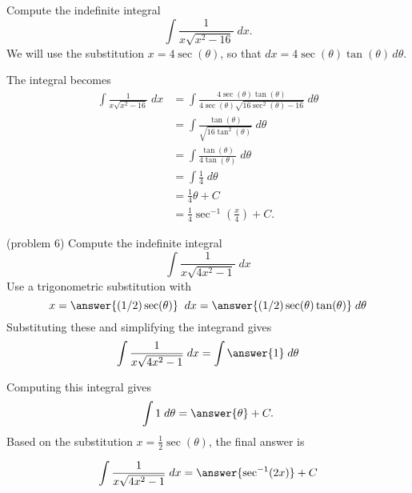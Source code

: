 \documentclass{ximera}
\begin{document}
\begin{example}[example 6]
Compute the indefinite integral
\[
\int \frac{1}{x\sqrt{x^2-16}} \; dx.
\]
We will use the substitution $x = 4\sec(\theta)$,
so that $dx = 4\sec(\theta)\tan(\theta) \, d\theta$.

The integral becomes
\begin{align*}
\int \frac{1}{x\sqrt{x^2-16}}\; dx &= \int \frac{4\sec(\theta)\tan(\theta)}{4\sec(\theta)\sqrt{16\sec^2(\theta)-16}}\; d\theta\\[6pt]
                                 &=  \int \frac{\tan(\theta)}{\sqrt{16\tan^2(\theta)}}\; d\theta\\[6pt]
                                 &=  \int \frac{\tan(\theta)}{4\tan(\theta)}\; d\theta\\[6pt]
                                  &=  \int \frac14 \; d\theta\\[6pt]
                                  &= \frac14 \theta + C\\[6pt]
                                  &= \frac14 \sec^{-1}\left(\frac{x}{4}\right)+C.
\end{align*}

\end{example}



\begin{problem}(problem 6)
Compute the indefinite integral
\[
\int \frac{1}{x\sqrt{4x^2 - 1}}\; dx
\]
Use a trigonometric substitution with\\
\[
x = \answer{(1/2)\sec(\theta)} \;\; dx = \answer{(1/2)\sec(\theta)\tan(\theta)} \; d\theta
\]
Substituting these and simplifying the integrand gives\\
\[
\int  \frac{1}{x\sqrt{4x^2-1}} \; dx = \int \answer{1} \; d\theta
\]



Computing this integral gives
\[
\int 1 \; d\theta = \answer{\theta } + C.
\]
Based on the substitution $x = \frac12\sec(\theta)$, the final answer is

\[
\int   \frac{1}{x\sqrt{4x^2 - 1}}\; dx = \answer{\sec^{-1}(2x)} + C
\]


\end{problem}
\end{document}
